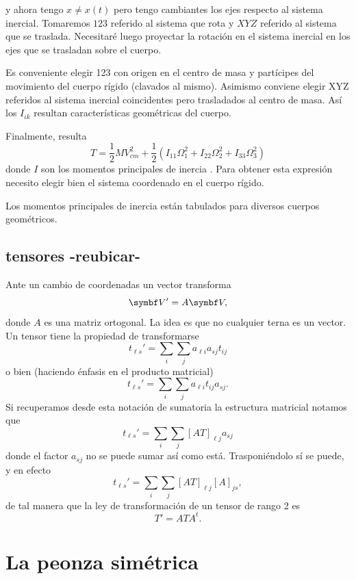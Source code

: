 \documentclass[10pt,oneside]{CBFT_book}
\begin{document}
y ahora tengo $x\neq x(t)$ pero tengo cambiantes los ejes respecto al sistema inercial.
Tomaremos $123$ referido al sistema que rota y $XYZ$ referido al sistema que se traslada.
Necesitaré luego proyectar la rotación en el sistema inercial en los ejes que se trasladan
sobre el cuerpo.

Es conveniente elegir 123 con origen en el centro de masa y partícipes del movimiento del 
cuerpo rígido (clavados al mismo). Asimismo conviene elegir XYZ referidos al sistema inercial
coincidentes pero trasladados al centro de masa. Así los $I_{ik}$ resultan características
geométricas del cuerpo.

Finalmente, resulta 
\[
	T = \frac 1 2 M V_{cm}^2 + \frac 1 2 \left( I_{11} \Omega_1^2 + I_{22} \Omega_2^2 + I_{33} \Omega_3^2 \right)
\]
donde $I$ son los momentos principales de inercia . Para obtener
esta expresión necesito elegir bien el sistema coordenado en el cuerpo rígido.

Los momentos principales de inercia están tabulados para diversos cuerpos geométricos.

\subsection{tensores -reubicar-}

Ante un cambio de coordenadas un vector transforma 
\[
	\vb{V}' = A \vb{V},
\]
donde $A$ es una matriz ortogonal. La idea es que no cualquier terna es un vector.
Un tensor tiene la propiedad de transformarse
\[
	t_{\ell s}' = \sum_i \sum_j a_{\ell i} a_{sj} t_{ij}
\]
o bien (haciendo énfasis en el producto matricial)
\[
	t_{\ell s}' = \sum_i \sum_j a_{\ell i} t_{ij} a_{sj}.
\]
Si recuperamos desde esta notación de sumatoria la estructura matricial notamos que 
\[
	t_{\ell s}' = \sum_i \sum_j [AT]_{\ell j} a_{sj}
\]
donde el factor $a_{sj}$ no se puede sumar así como está. Trasponiéndolo sí se puede,
y en efecto
\[
	t_{\ell s}' = \sum_i \sum_j [AT]_{\ell j} [A]_{js},
\]
de tal manera que la ley de transformación de un tensor de rango 2 es
\[
	T'= ATA^t.
\]


\section{La peonza simétrica}
\end{document}
